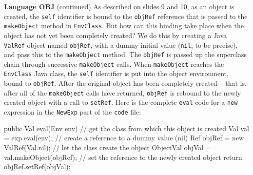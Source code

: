 \begin{minipage}[t]{\sw}
\slidenumber
\LARGE
{\bf Language OBJ} (continued)\exx
As described on slides 9 and 10,
as an object is created,
the \verb'self' identifier is bound
to the \verb'objRef' reference that is passed to
the \verb'makeObject' method in \verb'EnvClass'.
But how can this binding take place
when the object has not yet been completely created?
We do this by creating a Java \verb'ValRef' object named \verb'objRef',
with a dummy initial value (\verb'nil', to be precise),
and pass this to the \verb'makeObject' method.\exx
The \verb'objRef' is passed up the superclass chain
through successive \verb'makeObject' calls.
When \verb'makeObject' reaches the \verb'EnvClass' Java class,
the \verb'self' identifier is put into the object environment,
bound to \verb'objRef'.
After the original object has been completely created --
that is, after all of the \verb'makeObject' calls have returned,
\verb'objRef' is rebound to the newly created object
with a call to \verb'setRef'.
Here is the complete \verb'eval' code for a \verb'new' expression
in the \verb'NewExp' part of the \verb'code' file: 
\Large
\begin{qv}
    public Val eval(Env env) {
        // get the class from which this object is created
        Val val = exp.eval(env);
        // create a reference to a dummy value (nil)
        Ref objRef = new ValRef(Val.nil);
        // let the class create the object
        ObjectVal objVal = val.makeObject(objRef);
        // set the reference to the newly created object
        return objRef.setRef(objVal);
    }
\end{qv}
\end{minipage}
